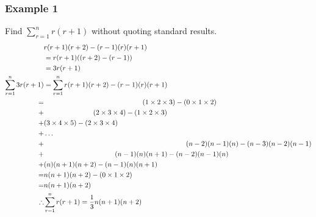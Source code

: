 \documentclass[a4paper,12pt]{article}
\begin{document}
\subsubsection*{Example 1}
Find $\sum^n_{r=1} r(r+1)$ without quoting standard results. 
\begin{align*}
& r(r+1)(r+2) - (r-1)(r)(r+1) \\
& = r(r+1)((r+2)-(r-1)) \\
& = 3r(r+1) \\
\sum^n_{r=1} 3r(r+1) & = \sum^n_{r=1} r(r+1)(r+2) - (r-1)(r)(r+1) \\
= & \hspace*{5cm} (1 \times 2 \times 3) - (0 \times 1 \times 2) \\
+ & \hspace*{2.5cm} (2 \times 3 \times 4) - (1 \times 2 \times 3) \\
+ & (3 \times 4 \times 5) - (2 \times 3 \times 4) \\
+ & \dots \\
+ & \hspace*{7.2cm} (n-2)(n-1)(n) - (n-3)(n-2)(n-1) \\
+ & \hspace*{3.6cm} (n-1)(n)(n+1) - (n-2)(n-1)(n) \\
+ & (n)(n+1)(n+2) - (n-1)(n)(n+1) \\
= & n(n+1)(n+2) - (0 \times 1 \times 2) \\
= & n(n+1)(n+2) \\
\therefore & \sum^n_{r=1} r(r+1) = \frac{1}{3}n(n+1)(n+2) \\
\end{align*}
\end{document}
